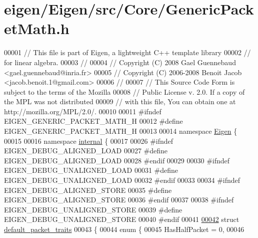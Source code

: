 \hypertarget{eigen_2_eigen_2src_2_core_2_generic_packet_math_8h_source}{}\section{eigen/\+Eigen/src/\+Core/\+Generic\+Packet\+Math.h}
\label{eigen_2_eigen_2src_2_core_2_generic_packet_math_8h_source}

\begin{DoxyCode}
00001 \textcolor{comment}{// This file is part of Eigen, a lightweight C++ template library}
00002 \textcolor{comment}{// for linear algebra.}
00003 \textcolor{comment}{//}
00004 \textcolor{comment}{// Copyright (C) 2008 Gael Guennebaud <gael.guennebaud@inria.fr>}
00005 \textcolor{comment}{// Copyright (C) 2006-2008 Benoit Jacob <jacob.benoit.1@gmail.com>}
00006 \textcolor{comment}{//}
00007 \textcolor{comment}{// This Source Code Form is subject to the terms of the Mozilla}
00008 \textcolor{comment}{// Public License v. 2.0. If a copy of the MPL was not distributed}
00009 \textcolor{comment}{// with this file, You can obtain one at http://mozilla.org/MPL/2.0/.}
00010 
00011 \textcolor{preprocessor}{#ifndef EIGEN\_GENERIC\_PACKET\_MATH\_H}
00012 \textcolor{preprocessor}{#define EIGEN\_GENERIC\_PACKET\_MATH\_H}
00013 
00014 \textcolor{keyword}{namespace }\hyperlink{namespace_eigen}{Eigen} \{
00015 
00016 \textcolor{keyword}{namespace }\hyperlink{namespaceinternal}{internal} \{
00017 
00026 \textcolor{preprocessor}{#ifndef EIGEN\_DEBUG\_ALIGNED\_LOAD}
00027 \textcolor{preprocessor}{#define EIGEN\_DEBUG\_ALIGNED\_LOAD}
00028 \textcolor{preprocessor}{#endif}
00029 
00030 \textcolor{preprocessor}{#ifndef EIGEN\_DEBUG\_UNALIGNED\_LOAD}
00031 \textcolor{preprocessor}{#define EIGEN\_DEBUG\_UNALIGNED\_LOAD}
00032 \textcolor{preprocessor}{#endif}
00033 
00034 \textcolor{preprocessor}{#ifndef EIGEN\_DEBUG\_ALIGNED\_STORE}
00035 \textcolor{preprocessor}{#define EIGEN\_DEBUG\_ALIGNED\_STORE}
00036 \textcolor{preprocessor}{#endif}
00037 
00038 \textcolor{preprocessor}{#ifndef EIGEN\_DEBUG\_UNALIGNED\_STORE}
00039 \textcolor{preprocessor}{#define EIGEN\_DEBUG\_UNALIGNED\_STORE}
00040 \textcolor{preprocessor}{#endif}
00041 
\hyperlink{struct_eigen_1_1internal_1_1default__packet__traits}{00042} \textcolor{keyword}{struct }\hyperlink{struct_eigen_1_1internal_1_1default__packet__traits}{default\_packet\_traits}
00043 \{
00044   \textcolor{keyword}{enum} \{
00045     HasHalfPacket = 0,
00046 

\end{DoxyCode}
